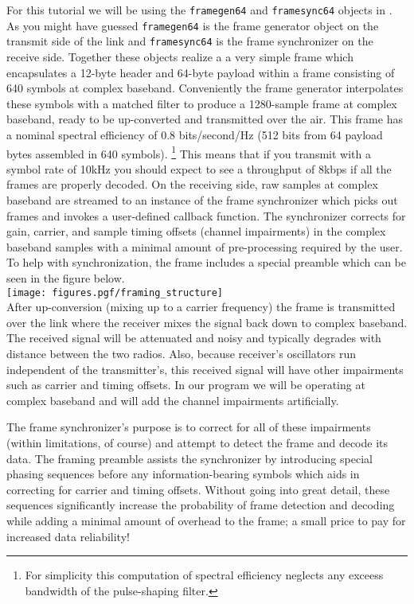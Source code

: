 For this tutorial we will be using the {\tt framegen64} and
{\tt framesync64} objects in \liquid.
As you might have guessed {\tt framegen64} is the frame generator object
on the transmit side of the link
and {\tt framesync64} is the frame synchronizer on the receive side.
%
Together these objects realize a
a very simple frame which encapsulates a 12-byte header and 64-byte
payload within a frame consisting of 640 symbols at complex baseband.
Conveniently the frame generator interpolates these symbols with a
matched filter to produce a 1280-sample frame at complex baseband,
ready to be up-converted and transmitted over the air.
This frame has a nominal spectral efficiency of 0.8 bits/second/Hz
(512 bits from 64 payload bytes assembled in 640 symbols).%
\footnote{
    For simplicity this computation of spectral efficiency
    neglects any exceess bandwidth of the pulse-shaping filter.}
This means that if you transmit with a symbol rate of 10kHz you should
expect to see a throughput of 8kbps if all the frames are properly
decoded.
On the receiving side,
raw samples at complex baseband are streamed to an instance of
the frame synchronizer which picks out frames and invokes a user-defined
callback function.
The synchronizer corrects for gain, carrier, and sample timing offsets
(channel impairments) in the complex baseband samples with a minimal
amount of pre-processing required by the user.
%
To help with synchronization, the frame includes a special preamble
which can be seen in the figure below.\\
%
\texttt{[image: figures.pgf/framing\_structure]}\\
%
After up-conversion (mixing up to a carrier frequency) the frame is
transmitted over the link where the receiver mixes the signal back down to
complex baseband.
The received signal will be attenuated and noisy and typically degrades
with distance between the two radios.
Also, because receiver's oscillators run independent of the
transmitter's,
this received signal will have other impairments such as carrier
and timing offsets.
In our program we will be operating at complex baseband and will add the
channel impairments artificially.

The frame synchronizer's purpose is to correct for all of these
impairments (within limitations, of course) and attempt to detect the
frame and decode its data.
The framing preamble assists the synchronizer by introducing special
phasing sequences before any information-bearing symbols which aids in
correcting for carrier and timing offsets.
Without going into great detail, these sequences significantly increase
the probability of frame detection and decoding while adding a minimal
amount of overhead to the frame;
a small price to pay for increased data reliability!


